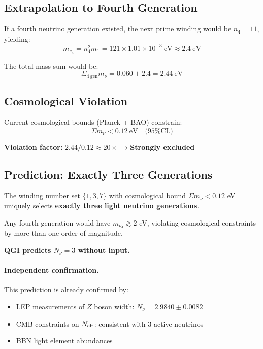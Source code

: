 \documentclass{article}
\numberwithin{equation}{section}
\theoremstyle{plain}
\theoremstyle{definition}
\theoremstyle{remark}
\begin{document}
\subsection{Extrapolation to Fourth Generation}

If a fourth neutrino generation existed, the next prime winding would be $n_4 = 11$, yielding:
\begin{equation}
m_{\nu_4} = n_4^2 m_1 = 121 \times 1.01 \times 10^{-3}~\text{eV} \approx 2.4~\text{eV}
\end{equation}

The total mass sum would be:
\begin{equation}
\Sigma_{4~\text{gen}} m_\nu = 0.060 + 2.4 = 2.44~\text{eV}
\end{equation}

\subsection{Cosmological Violation}

Current cosmological bounds (Planck + BAO) constrain:
\begin{equation}
\Sigma m_\nu < 0.12~\text{eV} \quad \text{(95\% CL)}
\end{equation}

\textbf{Violation factor:} $2.44/0.12 \approx 20\times$ → \textbf{Strongly excluded}

\subsection{Prediction: Exactly Three Generations}

\begin{tcolorbox}[title={QGI Prediction: Three Light Generations}, colback=green!5,colframe=green!40!black]
The winding number set $\{1,3,7\}$ with cosmological bound $\Sigma m_\nu < 0.12$ eV uniquely selects \textbf{exactly three light neutrino generations}.

Any fourth generation would have $m_{\nu_4} \gtrsim 2$ eV, violating cosmological constraints by more than one order of magnitude.

\textbf{QGI predicts $N_\nu = 3$ without input.}
\end{tcolorbox}

\paragraph{Independent confirmation.}
This prediction is already confirmed by:
\begin{itemize}
\item LEP measurements of $Z$ boson width: $N_\nu = 2.9840 \pm 0.0082$ \cite{PDG2024}
\item CMB constraints on $N_{\rm eff}$: consistent with 3 active neutrinos
\item BBN light element abundances
\end{itemize}
\end{document}
